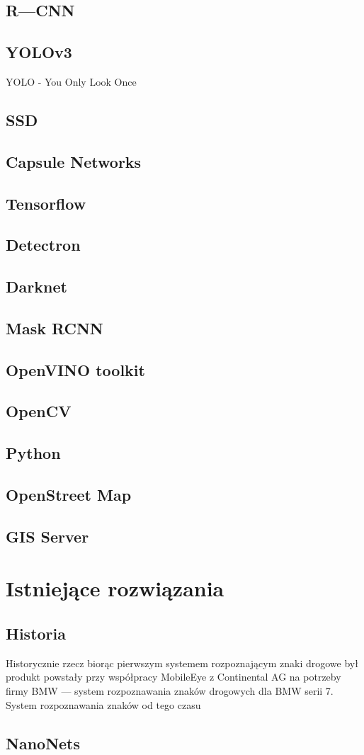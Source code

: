 \subsection{R---CNN}
\subsection{YOLOv3}
YOLO - You Only Look Once \cite{darkflowwebsite}
\subsection{SSD}
\subsection{Capsule Networks}
\subsection{Tensorflow}
\subsection{Detectron}
\subsection{Darknet}
\subsection{Mask RCNN}
\subsection{OpenVINO toolkit}
\subsection{OpenCV} 
\subsection{Python}
\subsection{OpenStreet Map}
\subsection{GIS Server}
\section{Istniejące rozwiązania}
\subsection{Historia}
Historycznie rzecz biorąc pierwszym systemem rozpoznającym znaki drogowe był produkt powstały przy współpracy MobileEye  z Continental AG na potrzeby firmy BMW --- system rozpoznawania znaków drogowych dla BMW serii 7. System rozpoznawania znaków od tego czasu
\subsection{NanoNets\cite{nanonets}}